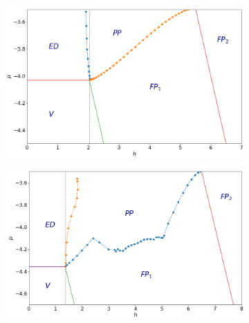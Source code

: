 \documentclass[a0,portrait]{a0poster}
\begin{document}
\begin{multicols}{2}
\begin{figure}[H]
    \centering
    \begin{subfigure}[t]{0.23\textwidth}
        \centering
        \includegraphics[width=\linewidth]{w1.png}
        \caption{}
    \end{subfigure}
    \hfill
    \begin{subfigure}[t]{0.23\textwidth}
        \centering
        \includegraphics[width=\linewidth]{w2.png}
        \caption{}
     \end{subfigure}


\end{figure}
\end{multicols}
\end{document}

